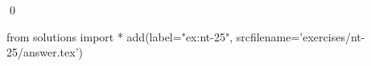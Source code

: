 
\begin{ex} 
  \label{ex:nt-25}
  
  \qed
\end{ex} 
\begin{python0}
from solutions import *
add(label="ex:nt-25",
    srcfilename='exercises/nt-25/answer.tex') 
\end{python0}
